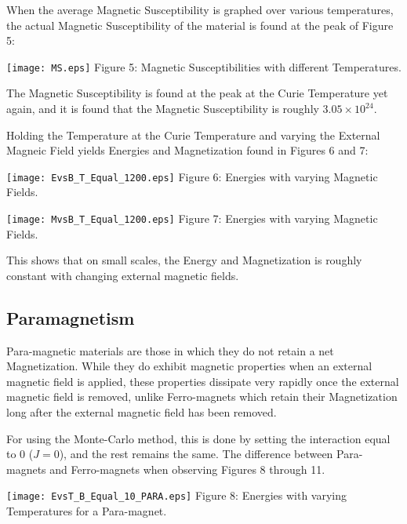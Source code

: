 \documentclass{article}
\begin{document}
\begin{multicols}{2}
When the average Magnetic Susceptibility is graphed over various temperatures, the actual Magnetic Susceptibility of the material is found at the peak of Figure 5:

\begin{center}
\texttt{[image: MS.eps]}
\scriptsize{
Figure 5: Magnetic Susceptibilities with different Temperatures.
}
\end{center}

The Magnetic Susceptibility is found at the peak at the Curie Temperature yet again, and it is found that the Magnetic Susceptibility is roughly $3.05 \times 10^{24}$.

Holding the Temperature at the Curie Temperature and varying the External Magneic Field yields Energies and Magnetization found in Figures 6 and 7:

\begin{center}
\texttt{[image: EvsB\_T\_Equal\_1200.eps]}
\scriptsize{
Figure 6: Energies with varying Magnetic Fields.
}
\end{center}

\begin{center}
\texttt{[image: MvsB\_T\_Equal\_1200.eps]}
\scriptsize{
Figure 7: Energies with varying Magnetic Fields.
}
\end{center}

This shows that on small scales, the Energy and Magnetization is roughly constant with changing external magnetic fields.

\subsection{Paramagnetism}
Para-magnetic materials are those in which they do not retain a net Magnetization. While they do exhibit magnetic properties when an external magnetic field is applied, these properties dissipate very rapidly once the external magnetic field is removed, unlike Ferro-magnets which retain their Magnetization long after the external magnetic field has been removed.

For using the Monte-Carlo method, this is done by setting the interaction equal to 0 ($J = 0$), and the rest remains the same. The difference between Para-magnets and Ferro-magnets when observing Figures 8 through 11.

\begin{center}
\texttt{[image: EvsT\_B\_Equal\_10\_PARA.eps]}
\scriptsize{
Figure 8: Energies with varying Temperatures for a Para-magnet.
}
\end{center}


\end{multicols}
\end{document}

